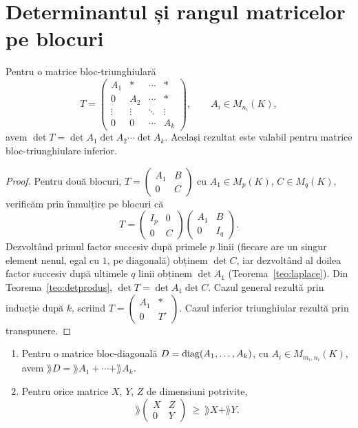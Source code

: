 \section{Determinantul și rangul matricelor pe blocuri}

\begin{propozitie}\label{prop:detbloc}
Pentru o matrice bloc-triunghiulară
\[
T=
\begin{pmatrix}
A_1 & * & \cdots & *\\
0 & A_2 & \cdots & *\\
\vdots & \vdots & \ddots & \vdots\\
0 & 0 & \cdots & A_k
\end{pmatrix},\qquad A_i\in M_{n_i}(K),
\]
avem $\det T=\det A_1\det A_2\cdots\det A_k$. Același rezultat este valabil pentru matrice bloc-triunghiulare inferior.
\end{propozitie}

\begin{proof}
Pentru două blocuri, $T=\begin{pmatrix}A_1&B\\0&C\end{pmatrix}$ cu $A_1\in M_p(K)$, $C\in M_q(K)$, verificăm prin înmulțire pe blocuri că
\[
T=\begin{pmatrix}I_p&0\\0&C\end{pmatrix}\begin{pmatrix}A_1&B\\0&I_q\end{pmatrix}.
\]
Dezvoltând primul factor succesiv după primele $p$ linii (fiecare are un singur element nenul, egal cu $1$, pe diagonală) obținem $\det C$, iar dezvoltând al doilea factor succesiv după ultimele $q$ linii obținem $\det A_1$ (Teorema~\ref{teo:laplace}). Din Teorema~\ref{teo:detprodus}, $\det T=\det A_1\det C$. Cazul general rezultă prin inducție după $k$, scriind $T=\begin{pmatrix}A_1&*\\0&T'\end{pmatrix}$. Cazul inferior triunghiular rezultă prin transpunere.
\end{proof}

\begin{propozitie}\label{prop:rangbloc}
\begin{enumerate}
\item Pentru o matrice bloc-diagonală $D=\operatorname{diag}(A_1,\dots,A_k)$, cu $A_i\in M_{m_i,n_i}(K)$, avem $\rang D=\rang A_1+\cdots+\rang A_k$.
\item Pentru orice matrice $X$, $Y$, $Z$ de dimensiuni potrivite,
\[
\rang\begin{pmatrix}X&Z\\0&Y\end{pmatrix}\ \ge\ \rang X+\rang Y .
\]
\end{enumerate}
\end{propozitie}

